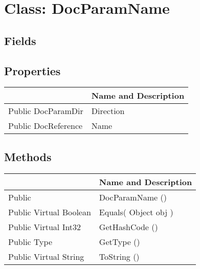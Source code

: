 \documentclass[11pt, oneside, a4paper]{book}
\begin{document}
\hypertarget{SoftwareEngineeringTools.{}Documentation.{}DocParamName}{}
\section{Class: DocParamName}

\subsection{Fields}

\subsection{Properties}
\begin{center}
\begin{tabular}{| p{3cm} | p{12cm} | }
\hline
\textbf{ } & \textbf{ Name and Description}\\
\hline
 Public  DocParamDir &  Direction\hypertarget{SoftwareEngineeringTools.{}Documentation.{}DocParamName.{}Direction}{}\\
\hline
 Public  DocReference &  Name\hypertarget{SoftwareEngineeringTools.{}Documentation.{}DocParamName.{}Name}{}\\
\hline
\end{tabular}
\end{center}

\subsection{Methods}
\begin{center}
\begin{tabular}{| p{3cm} | p{12cm} | }
\hline
\textbf{ } & \textbf{ Name and Description}\\
\hline
 Public  &  DocParamName ()\hypertarget{SoftwareEngineeringTools.{}Documentation.{}DocParamName.{}DocParamName}{}\\
\hline
 Public  Virtual  Boolean &  Equals(\hypertarget{SoftwareEngineeringTools.{}Documentation.{}DocParamName.{}Equals\_Object}{} Object  obj  )\\
\hline
 Public  Virtual  Int32 &  GetHashCode ()\hypertarget{SoftwareEngineeringTools.{}Documentation.{}DocParamName.{}GetHashCode}{}\\
\hline
 Public  Type &  GetType ()\hypertarget{SoftwareEngineeringTools.{}Documentation.{}DocParamName.{}GetType}{}\\
\hline
 Public  Virtual  String &  ToString ()\hypertarget{SoftwareEngineeringTools.{}Documentation.{}DocParamName.{}ToString}{}\\
\hline
\end{tabular}
\end{center}
 
\end{document}
